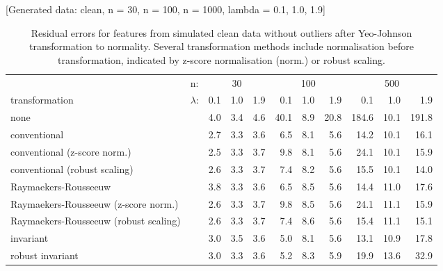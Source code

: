 \documentclass[
  a4paper,
]{article}
\begin{document}
{[}Generated data: clean, n = 30, n = 100, n = 1000, lambda = 0.1, 1.0,
1.9{]}

\begin{table}
\begin{center}
\caption{Residual errors for features from simulated clean data without outliers after Yeo-Johnson transformation to normality.
Several transformation methods include normalisation before transformation, indicated by z-score normalisation (norm.) or robust scaling.}
\label{tab:clean-transformation-residuals-appendix}
\small{
\begin{tabular}{l | l r r r r r r r r r}

\toprule
& n: & \multicolumn{3}{c}{30} & \multicolumn{3}{c}{100} & \multicolumn{3}{c}{500} \\
transformation & $\lambda$: & 0.1 & 1.0 & 1.9 & 0.1 & 1.0 & 1.9 & 0.1 & 1.0 & 1.9 \\

\midrule

none                                  & & 4.0 & 3.4 & 4.6 & 40.1 & 8.9 & 20.8 & 184.6 & 10.1 & 191.8 \\
conventional                          & & 2.7 & 3.3 & 3.6 &  6.5 & 8.1 &  5.6 &  14.2 & 10.1 &  16.1 \\
conventional (z-score norm.)          & & 2.5 & 3.3 & 3.7 &  9.8 & 8.1 &  5.6 &  24.1 & 10.1 &  15.9 \\
conventional (robust scaling)         & & 2.6 & 3.3 & 3.7 &  7.4 & 8.2 &  5.6 &  15.5 & 10.1 &  14.0 \\
Raymaekers-Rousseeuw                  & & 3.8 & 3.3 & 3.6 &  6.5 & 8.5 &  5.6 &  14.4 & 11.0 &  17.6 \\
Raymaekers-Rousseeuw (z-score norm.)  & & 2.6 & 3.3 & 3.7 &  9.8 & 8.5 &  5.6 &  24.1 & 11.1 &  15.9 \\
Raymaekers-Rousseeuw (robust scaling) & & 2.6 & 3.3 & 3.7 &  7.4 & 8.6 &  5.6 &  15.4 & 11.1 &  15.1 \\
invariant                             & & 3.0 & 3.5 & 3.6 &  5.0 & 8.1 &  5.6 &  13.1 & 10.9 &  17.8 \\
robust invariant                      & & 3.0 & 3.3 & 3.6 &  5.2 & 8.3 &  5.9 &  19.9 & 13.6 &  32.9 \\
\bottomrule
\end{tabular}
}
\end{center}
\end{table}
\end{document}
